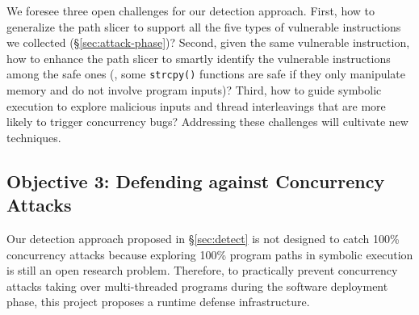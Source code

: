 



 We foresee three open challenges for our detection 
approach. First, how to generalize the path slicer to support all the 
five types of vulnerable instructions we collected (\S\ref{sec:attack-phase})? 
Second, given the same vulnerable instruction, how to enhance the 
path slicer to smartly identify the vulnerable instructions among the safe ones 
(\eg, some \texttt{strcpy()} functions are safe if they only manipulate memory 
and do not involve program inputs)? Third, how to guide symbolic execution 
to explore malicious inputs and thread interleavings that are more likely to 
trigger concurrency bugs? Addressing these challenges will cultivate 
new techniques.

\vspace{-.15in}\subsection{Objective 3: Defending against Concurrency 
Attacks}\label{sec:defense}\vspace{-.075in}

Our detection approach proposed in \S\ref{sec:detect} is not 
designed to catch 100\% concurrency attacks because exploring 100\% program 
paths in symbolic execution is still an open research problem. Therefore, to 
practically prevent concurrency attacks taking over multi-threaded programs 
during the software deployment phase, this project proposes a runtime defense 
infrastructure.

